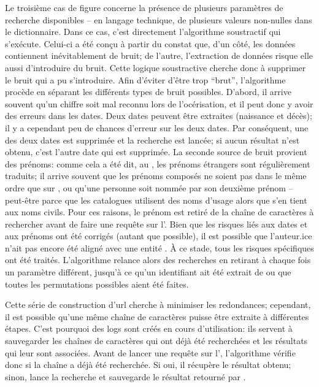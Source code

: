 Le troisième cas de figure concerne la présence de plusieurs paramètres de recherche disponibles -- en langage technique, de plusieurs valeurs non-nulles dans le \gls{dictionnaire}. Dans ce cas, c'est directement l'algorithme soustractif qui s'exécute. Celui-ci a été conçu à partir du constat que, d'un côté, les données contiennent inévitablement de bruit; de l'autre, l'extraction de données risque elle aussi d'introduire du bruit. Cette logique soustractive cherche donc à supprimer le bruit qui a pu s'introduire. Afin d'éviter d'être trop \enquote{brut}, l'algorithme procède en séparant les différents types de bruit possibles. D'abord, il arrive souvent qu'un chiffre soit mal reconnu lors de l'océrisation, et il peut donc y avoir des erreurs dans les dates. Deux dates peuvent être extraites (naissance et décès); il y a cependant peu de chances d'erreur sur les deux dates. Par conséquent, une des deux dates est supprimée et la recherche est lancée; si aucun résultat n'est obtenu, c'est l'autre date qui est supprimée. La seconde source de bruit provient des prénoms: comme cela a été dit, au , les prénoms étrangers sont régulièrement traduits; il arrive souvent que les prénoms composés ne soient pas dans le même ordre que sur \wkd{}, ou qu'une personne soit nommée par son deuxième prénom -- peut-être parce que les catalogues utilisent des noms d'usage alors que \wkd{} s'en tient aux noms civils. Pour ces raisons, le prénom est retiré de la chaîne de caractères à rechercher avant de faire une requête sur l'\api{}. Bien que les risques liés aux dates et aux prénoms ont été corrigés (autant que possible), il est possible que l'auteur.ice n'ait pas encore été aligné avec une entité \wkd{}. À ce stade, tous les risques spécifiques ont été traités. L'algorithme relance alors des recherches en retirant à chaque fois un paramètre différent, jusqu'à ce qu'un identifiant ait été extrait de \wkd{} ou que toutes les permutations possibles aient été faites.

Cette série de construction d'\gls{url} cherche à minimiser les redondances; cependant, il est possible qu'une même chaîne de caractères puisse être extraite à différentes étapes. C'est pourquoi des \glspl{log} sont créés en cours d'utilisation: ils servent à sauvegarder les chaînes de caractères qui ont déjà été recherchées et les résultats qui leur sont associées. Avant de lancer une requête sur l'\api{}, l'algorithme vérifie donc si la chaîne a déjà été recherchée. Si oui, il récupère le résultat obtenu; sinon, lance la recherche et sauvegarde le résultat retourné par \wkd{}.

